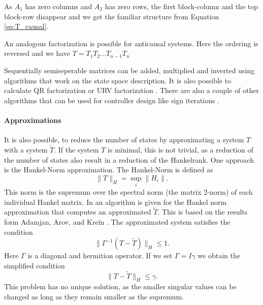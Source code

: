 \documentclass[doctype=mastersthesis,BCOR=15mm,biblatex]{ldvbook}%
\newcommand{\eye}{I} %
\begin{document}
As $A_1$ has zero columns and $A_3$ has zero rows, the first block-column and the top block-row disappear and we get the familiar structure from Equation\,\ref{eq:T_causal}.

An analogous factorization is possible for anticausal systems.
Here the ordering is reversed and we have $T = T_1 T_2 \dots T_{n-1} T_{n}$

Sequentially semiseperable matrices can be added, multiplied and inverted using algorithms that work on the state space description.
It is also possible to calculate QR factorization \cite{chandrasekaran_fast_2002,tong_blind_2003} or URV factorization \cite{chandrasekaran_fast_2005}. 
There are also a couple of other algorithms that can be used for controller design like sign iterations \cite{rice_efficient_2010}.

\paragraph{Approximations}
It is also possible, to reduce the number of states by approximating a system $T$ with a system $\tilde{T}$.
If the system $T$ is minimal, this is not trivial, as a reduction of the number of states also result in a reduction of the Hankelrank.
One approach is the Hankel-Norm approximation.
The Hankel-Norm is defined as
\begin{equation}
	\|T\|_H = \sup_{i}\|H_i\|.
\end{equation}
This norm is the supremum over the spectral norm (the matrix 2-norm) of each individual Hankel matrix.
In \cite{dewilde_time-varying_1998} an algorithm is given for the Hankel norm approximation that computes an approximated $\tilde{T}$.  
This is based on the results form Adamjan, Arov, and Kreĭn \cite{adamjan_analytic_1971}.
The approximated system satisfies the condition
\begin{equation}
	\| \Gamma^{-1}(T-\tilde{T})\|_H \leq 1.
\end{equation}
Here $\Gamma$ is a diagonal and hermition operator. 
If we set $\Gamma = \eye\gamma$ we obtain the simplified condition
\begin{equation}
	\|T-\tilde{T}\|_H \leq \gamma.
\end{equation}
This problem has no unique solution, as the smaller singular values can be changed as long as they remain smaller as the supremum.
\end{document}

